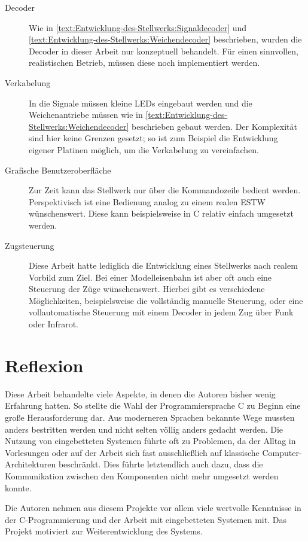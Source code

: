 \begin{description}
    \item[Decoder] Wie in \autoref{text:Entwicklung-des-Stellwerks:Signaldecoder}  und \autoref{text:Entwicklung-des-Stellwerks:Weichendecoder}  beschrieben, wurden die Decoder in dieser Arbeit nur konzeptuell behandelt. Für einen sinnvollen, realistischen Betrieb, müssen diese noch implementiert werden.
    \item[Verkabelung] In die Signale müssen kleine LEDs eingebaut werden und die Weichenantriebe müssen wie in \autoref{text:Entwicklung-des-Stellwerks:Weichendecoder}  beschrieben gebaut werden. Der Komplexität sind hier keine Grenzen gesetzt; so ist zum Beispiel die Entwicklung eigener Platinen möglich, um die Verkabelung zu vereinfachen.
    \item[Grafische Benutzeroberfläche] Zur Zeit kann das Stellwerk nur über die Kommandozeile bedient werden. Perspektivisch ist eine Bedienung analog zu einem realen \ac{ESTW} wünschenswert. Diese kann beispielsweise in C relativ einfach umgesetzt werden.
    \item[Zugsteuerung] Diese Arbeit hatte lediglich die Entwicklung eines Stellwerks nach realem Vorbild zum Ziel. Bei einer Modelleisenbahn ist aber oft auch eine Steuerung der Züge wünschenswert. Hierbei gibt es verschiedene Möglichkeiten, beispielsweise die vollständig manuelle Steuerung, oder eine vollautomatische Steuerung mit einem Decoder in jedem Zug über Funk oder Infrarot.
\end{description}

\section{Reflexion}\label{text:Fazit-und-Ausblick:Reflexion}

Diese Arbeit behandelte viele Aspekte, in denen die Autoren bisher wenig Erfahrung hatten. So stellte die Wahl der Programmiersprache C zu Beginn eine große Herausforderung dar. Aus moderneren Sprachen bekannte Wege mussten anders bestritten werden und nicht selten völlig anders gedacht werden. Die Nutzung von eingebetteten Systemen führte oft zu Problemen, da der Alltag in Vorlesungen oder auf der Arbeit sich fast ausschließlich auf klassische Computer-Architekturen beschränkt. Dies führte letztendlich auch dazu, dass die Kommunikation zwischen den Komponenten nicht mehr umgesetzt werden konnte.

Die Autoren nehmen aus diesem Projekte vor allem viele wertvolle Kenntnisse in der C-Programmierung und der Arbeit mit eingebetteten Systemen mit. Das Projekt motiviert zur Weiterentwicklung des Systems.
